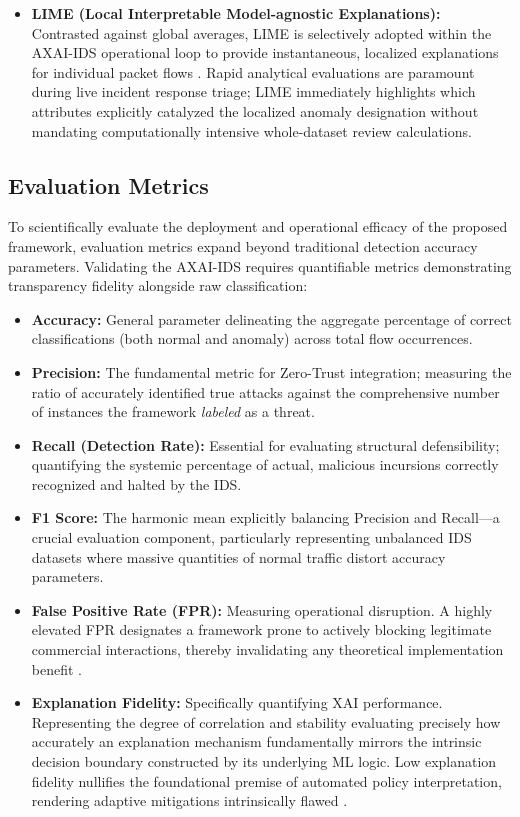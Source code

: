 \documentclass[conference]{IEEEtran}
\begin{document}
\begin{itemize}
\item \textbf{LIME (Local Interpretable Model-agnostic Explanations):} Contrasted against global averages, LIME is selectively adopted within the AXAI-IDS operational loop to provide instantaneous, localized explanations for individual packet flows \cite{sharafaldin2018toward, moustafa2015unsw}. Rapid analytical evaluations are paramount during live incident response triage; LIME immediately highlights which attributes explicitly catalyzed the localized anomaly designation without mandating computationally intensive whole-dataset review calculations.
\end{itemize}

\subsection{Evaluation Metrics}

To scientifically evaluate the deployment and operational efficacy of the proposed framework, evaluation metrics expand beyond traditional detection accuracy parameters. Validating the AXAI-IDS requires quantifiable metrics demonstrating transparency fidelity alongside raw classification:

\begin{itemize}
\item \textbf{Accuracy:} General parameter delineating the aggregate percentage of correct classifications (both normal and anomaly) across total flow occurrences.
\item \textbf{Precision:} The fundamental metric for Zero-Trust integration; measuring the ratio of accurately identified true attacks against the comprehensive number of instances the framework \textit{labeled} as a threat.
\item \textbf{Recall (Detection Rate):} Essential for evaluating structural defensibility; quantifying the systemic percentage of actual, malicious incursions correctly recognized and halted by the IDS.
\item \textbf{F1 Score:} The harmonic mean explicitly balancing Precision and Recall—a crucial evaluation component, particularly representing unbalanced IDS datasets where massive quantities of normal traffic distort accuracy parameters.
\item \textbf{False Positive Rate (FPR):} Measuring operational disruption. A highly elevated FPR designates a framework prone to actively blocking legitimate commercial interactions, thereby invalidating any theoretical implementation benefit \cite{mahbooba2021explainable}.
\item \textbf{Explanation Fidelity:} Specifically quantifying XAI performance. Representing the degree of correlation and stability evaluating precisely how accurately an explanation mechanism fundamentally mirrors the intrinsic decision boundary constructed by its underlying ML logic. Low explanation fidelity nullifies the foundational premise of automated policy interpretation, rendering adaptive mitigations intrinsically flawed \cite{alotaibi2023adaptive, chen2016xgboost}.
\end{itemize}
\end{document}
